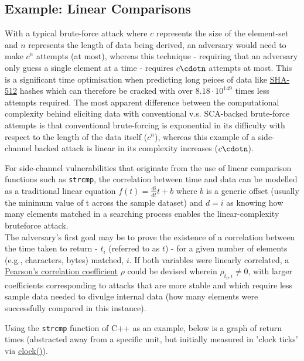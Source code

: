 \subsection{Example: Linear Comparisons}
		
			With a typical brute-force attack where \emph{$c$} represents the size of the element-set and \emph{$n$} represents the length of data being derived,
			an adversary would need to make \emph{$c^n$} attempts (at most), whereas this technique - requiring that an adversary
			only guess a single element at a time - requires \emph{$c\cdotn$} attempts at most. This is a significant time optimisation when predicting long peices
			of data like \href{https://en.wikipedia.org/wiki/SHA-2}{SHA-512}
			hashes which can therefore be cracked with over \emph{$8.18\cdot10^{149}$} times less attempts required. The most apparent difference
			between the computational complexity behind eliciting data with conventional v.s. SCA-backed brute-force attempts is that conventional brute-forcing
			is exponential in its difficulty with respect to the length of the data itself (\emph{$c^n$}), whereas this example of a side-channel backed attack is linear
			in its complexity increases (\emph{$c\cdotn$}).
		
		
			For side-channel vulnerabilities that originate from the use of linear comparison functions such as \texttt{strcmp},
			the correlation between time and data can be modelled as a traditional
			linear equation \emph{$f(t)=\frac{di}{dt}t+b$} where \emph{$b$} is a generic offset (usually the minimum value of t across the sample dataset)
			and \emph{$d=i$} as knowing how many elements matched in a searching process enables the linear-complexity bruteforce attack.
			\\

			The adversary's first goal may be to prove the existence of a correlation between the
			time taken to return - \emph{$t_i$} (referred to as \emph{$t$}) - for a given number of elements (e.g., characters, bytes) matched, \emph{$i$}.
			If both variables were linearly correlated, a
			\href{https://statistics.laerd.com/statistical-guides/pearson-correlation-coefficient-statistical-guide.php}{Pearson's correlation coefficient} \emph{$\rho$} could be devised wherein
			\emph{$\rho_{t_i,i} \neq 0$}, with larger coefficients corresponding to attacks that are more stable and which require
			less sample data needed to divulge internal data (how many elements were successfully compared in this instance).
		
		
			Using the \texttt{strcmp} function of C++ as an example,
			below is a graph of return times (abstracted away from a specific unit, but initially
			measured in 'clock ticks' via \href{https://cplusplus.com/reference/ctime/clock/}{clock()}).
		
